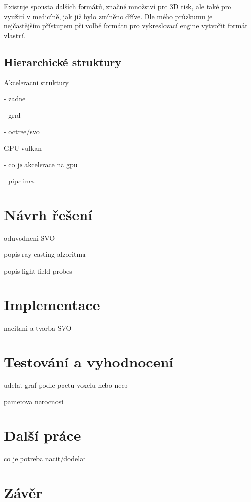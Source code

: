 Existuje spousta dalších formátů, značné množství pro 3D tisk, ale také pro využití v medicíně, jak již bylo zmíněno dříve. Dle mého průzkumu je nejčastějším přístupem při volbě formátu pro vykreslovací engine vytvořit formát vlastní.


\section{Hierarchické struktury}


Akceleracni struktury

 - zadne
 
 - grid
 
 - octree/svo
 
GPU vulkan

 - co je akcelerace na gpu

 - pipelines

\chapter{Návrh řešení}
\label{navrh}
oduvodneni SVO

popis ray casting algoritmu

popis light field probes

\chapter{Implementace}
\label{implementace}
nacitani a tvorba SVO


\chapter{Testování a vyhodnocení}
\label{testovani}
udelat graf podle poctu voxelu nebo neco

pametova narocnost

\chapter{Další práce}
\label{dalsi_prace}
co je potreba nacit/dodelat


\chapter{Závěr}
\label{zaver}




